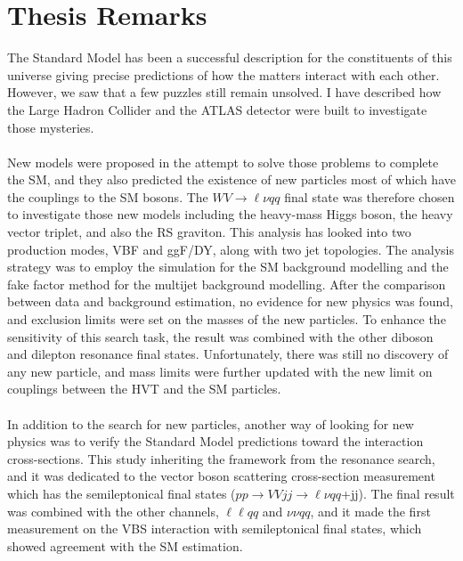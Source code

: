 \chapter{Thesis Remarks}
The Standard Model has been a successful description for the constituents of this universe giving precise predictions of how the matters interact with each other. However, we saw that a few puzzles still remain unsolved. I have described how the Large Hadron Collider and the ATLAS detector were built to investigate those mysteries.
\\
\\New models were proposed in the attempt to solve those problems to complete the SM, and they also predicted the existence of new particles most of which have the couplings to the SM bosons. The $WV\to \ell\nu qq$ final state was therefore chosen to investigate those new models including the heavy-mass Higgs boson, the heavy vector triplet, and also the RS graviton. This analysis has looked into two production modes, VBF and ggF/DY, along with two jet topologies. The analysis strategy was to employ the simulation for the SM background modelling and the fake factor method for the multijet background modelling. After the comparison between data and background estimation, no evidence for new physics was found, and exclusion limits were set on the masses of the new particles. To enhance the sensitivity of this search task, the result was combined with the other diboson and dilepton resonance final states. Unfortunately, there was still no discovery of any new particle, and mass limits were further updated with the new limit on couplings between the HVT and the SM particles. 
\\
\\In addition to the search for new particles, another way of looking for new physics was to verify the Standard Model predictions toward the interaction cross-sections. This study inheriting the framework from the resonance search, and it was dedicated to the vector boson scattering cross-section measurement which has the semileptonical final states ($pp\to VVjj \to \ell\nu qq$+jj). The final result was combined with the other channels, $\ell\ell qq$ and $\nu\nu qq$, and it made the first measurement on the VBS interaction with semileptonical final states, which showed agreement with the SM estimation.
\\
